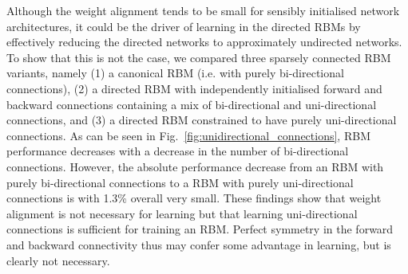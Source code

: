 \documentclass[11pt]{article}
\begin{document}
Although the weight alignment tends to be small for sensibly
initialised network architectures, it could be the driver of learning
in the directed RBMs by effectively reducing the directed networks to
approximately undirected networks. To show that this is not the case,
we compared three sparsely connected RBM variants, namely (1) a
canonical RBM (i.e. with purely bi-directional connections), (2) a
directed RBM with independently initialised forward and backward
connections containing a mix of bi-directional and uni-directional
connections, and (3) a directed RBM constrained to have purely
uni-directional connections.
As can be seen in Fig.~\ref{fig:unidirectional_connections}, RBM
performance decreases with a decrease in the number of bi-directional
connections. However, the absolute performance decrease from an RBM
with purely bi-directional connections to a RBM with purely
uni-directional connections is with 1.3\% overall very small.
These findings show that weight alignment is not necessary
for learning but that learning uni-directional connections is
sufficient for training an RBM. Perfect symmetry in the forward and
backward connectivity thus may confer some advantage in learning, but
is clearly not necessary.
\end{document}
